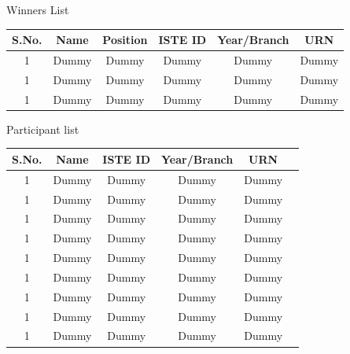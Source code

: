 \documentclass[12pt, a4 paper]{article}
\begin{document}
\begin{center}
\huge Winners List
\end{center}

\begin{table}[h!]
  \begin{center}
    \begin{tabular}{|c|c|c|c|c|c|} 
    \toprule %
      \textbf{S.No.} & \textbf{Name} & \textbf{Position} & \textbf{ISTE ID} &\textbf{Year/Branch} & \textbf{URN}\\
      \midrule %
      1 & Dummy & Dummy & Dummy & Dummy & Dummy\\
      1 & Dummy & Dummy & Dummy & Dummy & Dummy\\
      1 & Dummy & Dummy & Dummy & Dummy & Dummy\\
      \bottomrule %
    \end{tabular}
  \end{center}
\end{table}

\begin{center}
\huge Participant list
\end{center}

\begin{table}[h!]
  \begin{center}
    \begin{tabular}{|c|c|c|c|c|c|} 
    \toprule %
      \textbf{S.No.} & \textbf{Name} & \textbf{ISTE ID} &\textbf{Year/Branch} & \textbf{URN}\\
      \midrule %
      1 & Dummy & Dummy & Dummy & Dummy \\
      1 & Dummy & Dummy & Dummy & Dummy \\
      1 & Dummy & Dummy & Dummy & Dummy  \\
      1 & Dummy & Dummy & Dummy & Dummy \\
      1 & Dummy & Dummy & Dummy & Dummy  \\
      1 & Dummy & Dummy & Dummy & Dummy  \\
      1 & Dummy & Dummy & Dummy & Dummy \\
      1 & Dummy & Dummy & Dummy & Dummy \\
      1 & Dummy & Dummy & Dummy & Dummy \\
      \bottomrule %
    \end{tabular}
  \end{center}
\end{table}
\end{document}
